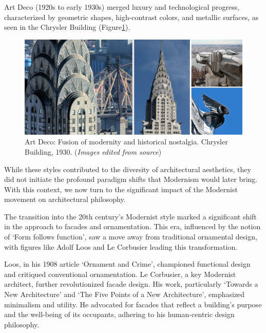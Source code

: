 Art Deco (1920s to early 1930s) merged luxury and technological progress, characterized by geometric shapes, high-contrast colors, and metallic surfaces, as seen in the Chrysler Building\cite{Kotb2014} (Figure\ref{fig:ArtDeco}).

    \begin{figure}[htb]
    \centering
    \includegraphics[width= \linewidth]{Images/ArtDecoFacade}
    \caption{Art Deco: Fusion of modernity and historical nostalgia. Chrysler Building, 1930. (\textit{Images edited from source})}
    \label{fig:ArtDeco}
    \end{figure}

While these styles contributed to the diversity of architectural aesthetics, they did not initiate the profound paradigm shifts that Modernism would later bring.
With this context, we now turn to the significant impact of the Modernist movement on architectural philosophy.


The transition into the 20th century's Modernist style marked a significant shift in the approach to facades and ornamentation.
This era, influenced by the notion of `Form follows function', saw a move away from traditional ornamental design, with figures like Adolf Loos and Le Corbusier leading this transformation.

Loos, in his 1908 article `Ornament and Crime', championed functional design and critiqued conventional ornamentation\cite{Saglam2014}.
Le Corbusier, a key Modernist architect, further revolutionized facade design.
His work, particularly `Towards a New Architecture'\cite{Studio2a2023} and `The Five Points of a New Architecture', emphasized minimalism and utility.
He advocated for facades that reflect a building's purpose and the well-being of its occupants, adhering to his human-centric design philosophy\cite{Virseda2021}.

